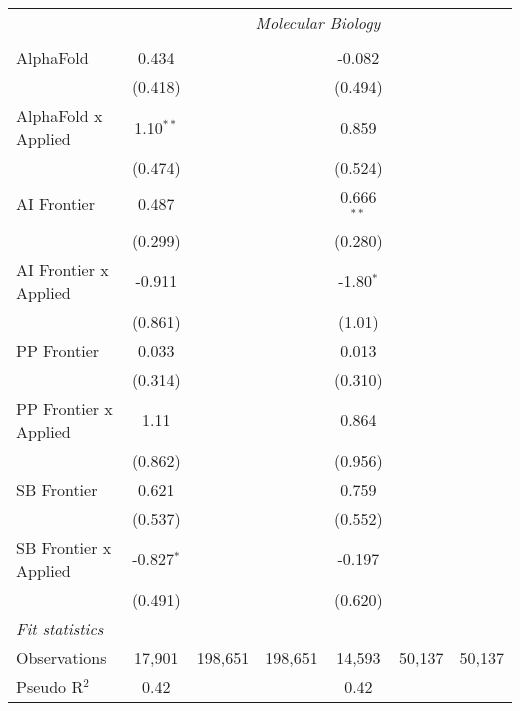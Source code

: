 \begin{tabular}{lcccccc}
 & \multicolumn{6}{c}{\textit{Molecular Biology}} \\ \\
   AlphaFold             & 0.434        &         &         & -0.082       &        &   \\   
                         & (0.418)      &         &         & (0.494)      &        &   \\   
   AlphaFold x Applied   & 1.10$^{**}$  &         &         & 0.859        &        &   \\   
                         & (0.474)      &         &         & (0.524)      &        &   \\   
   AI Frontier           & 0.487        &         &         & 0.666$^{**}$ &        &   \\   
                         & (0.299)      &         &         & (0.280)      &        &   \\   
   AI Frontier x Applied & -0.911       &         &         & -1.80$^{*}$  &        &   \\   
                         & (0.861)      &         &         & (1.01)       &        &   \\   
   PP Frontier           & 0.033        &         &         & 0.013        &        &   \\   
                         & (0.314)      &         &         & (0.310)      &        &   \\   
   PP Frontier x Applied & 1.11         &         &         & 0.864        &        &   \\   
                         & (0.862)      &         &         & (0.956)      &        &   \\   
   SB Frontier           & 0.621        &         &         & 0.759        &        &   \\   
                         & (0.537)      &         &         & (0.552)      &        &   \\   
   SB Frontier x Applied & -0.827$^{*}$ &         &         & -0.197       &        &   \\   
                         & (0.491)      &         &         & (0.620)      &        &   \\   
   \midrule
   \emph{Fit statistics}\\
   Observations          & 17,901       & 198,651 & 198,651 & 14,593       & 50,137 & 50,137\\  
   Pseudo R$^2$          & 0.42         &         &         & 0.42         &        & \\  
   

\end{tabular}
